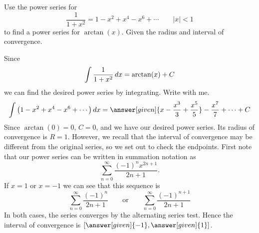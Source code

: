 \documentclass{ximera}
\begin{document}
\begin{example}
  Use the power series for
  \[
  \frac{1}{1+x^2} = 1 - x^2 + x^4 - x^6 + \cdots \qquad|x|< 1 
  \]
  to find a power series for $\arctan(x)$. Given the radius and interval of convergence.
  \begin{explanation}
    Since
    \[
    \int\frac{1}{1+x^2} \mathop{}\!d x = \arctan(x)+C
    \]
    we can find the desired power series by integrating. Write with me.
    \[
    \int \left(1 - x^2 + x^4 - x^6 + \cdots\right)\d x = \answer[given]{x - \frac{x^3}{3} + \frac{x^5}{5}} - \frac{x^7}{7} + \cdots +C
    \]
    Since $\arctan(0) = 0$, $C=0$, and we have our desired power
    series. Its radius of convergence is $R=1$. However,
    we recall that the interval of convergence may be different from the original series, so we 
    set out to check the endpoints. First note that our power series can be written in summation notation as
    \[
    \sum_{n=0}^\infty \frac{(-1)^n x^{2n+1}}{2n+1}.
    \]
    If $x=1$ or $x=-1$ we can see that this sequence is
    \[
    \sum_{n=0}^\infty \frac{(-1)^n}{2n+1}\qquad\text{or}\qquad\sum_{n=0}^\infty \frac{(-1)^{n+1}}{2n+1}
    \]
    In both cases, the series converges by the alternating series
    test. Hence the interval of convergence is $\left[\answer[given]{-1},\answer[given]{1}\right]$.
  \end{explanation}
\end{example}
\end{document}

